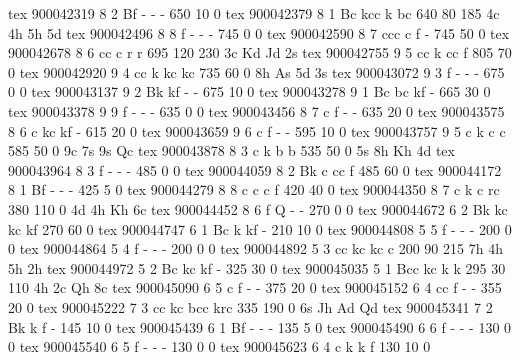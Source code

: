tex       900042319  8  2 Bf  -     -     -          650   10    0 
tex       900042379  8  1 Bc  kcc   k     bc         640   80  185 4c 4h 5h 5d
tex       900042496  8  8 f   -     -     -          745    0    0 
tex       900042590  8  7 ccc c     f     -          745   50    0 
tex       900042678  8  6 cc  c     r     r          695  120  230 3c Kd Jd 2s
tex       900042755  9  5 cc  k     cc    f          805   70    0 
tex       900042920  9  4 cc  k     kc    kc         735   60    0 8h As 5d 3s
tex       900043072  9  3 f   -     -     -          675    0    0 
tex       900043137  9  2 Bk  kf    -     -          675   10    0 
tex       900043278  9  1 Bc  bc    kf    -          665   30    0 
tex       900043378  9  9 f   -     -     -          635    0    0 
tex       900043456  8  7 c   f     -     -          635   20    0 
tex       900043575  8  6 c   kc    kf    -          615   20    0 
tex       900043659  9  6 c   f     -     -          595   10    0 
tex       900043757  9  5 c   k     c     c          585   50    0 9c 7s 9s Qc
tex       900043878  8  3 c   k     b     b          535   50    0 5s 8h Kh 4d
tex       900043964  8  3 f   -     -     -          485    0    0 
tex       900044059  8  2 Bk  c     cc    f          485   60    0 
tex       900044172  8  1 Bf  -     -     -          425    5    0 
tex       900044279  8  8 c   c     c     f          420   40    0 
tex       900044350  8  7 c   k     c     rc         380  110    0 4d 4h Kh 6c
tex       900044452  8  6 f   Q     -     -          270    0    0 
tex       900044672  6  2 Bk  kc    kc    kf         270   60    0 
tex       900044747  6  1 Bc  k     kf    -          210   10    0 
tex       900044808  5  5 f   -     -     -          200    0    0 
tex       900044864  5  4 f   -     -     -          200    0    0 
tex       900044892  5  3 cc  kc    kc    c          200   90  215 7h 4h 5h 2h
tex       900044972  5  2 Bc  kc    kf    -          325   30    0 
tex       900045035  5  1 Bcc kc    k     k          295   30  110 4h 2c Qh 8c
tex       900045090  6  5 c   f     -     -          375   20    0 
tex       900045152  6  4 cc  f     -     -          355   20    0 
tex       900045222  7  3 cc  kc    bcc   krc        335  190    0 6s Jh Ad Qd
tex       900045341  7  2 Bk  k     f     -          145   10    0 
tex       900045439  6  1 Bf  -     -     -          135    5    0 
tex       900045490  6  6 f   -     -     -          130    0    0 
tex       900045540  6  5 f   -     -     -          130    0    0 
tex       900045623  6  4 c   k     k     f          130   10    0 
